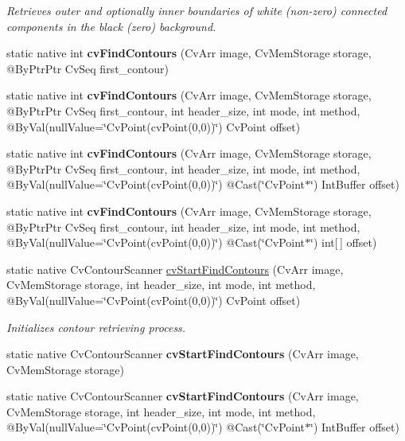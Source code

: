 \begin{DoxyCompactItemize}
\begin{DoxyCompactList}\small\item\em Retrieves outer and optionally inner boundaries of white (non-\/zero) connected components in the black (zero) background. \end{DoxyCompactList}\item 
static native int {\bfseries cv\+Find\+Contours} (Cv\+Arr image, Cv\+Mem\+Storage storage, @By\+Ptr\+Ptr Cv\+Seq first\+\_\+contour)
\item 
static native int {\bfseries cv\+Find\+Contours} (Cv\+Arr image, Cv\+Mem\+Storage storage, @By\+Ptr\+Ptr Cv\+Seq first\+\_\+contour, int header\+\_\+size, int mode, int method, @By\+Val(null\+Value=\char`\"{}Cv\+Point(cv\+Point(0,0))\char`\"{}) Cv\+Point offset)
\item 
static native int {\bfseries cv\+Find\+Contours} (Cv\+Arr image, Cv\+Mem\+Storage storage, @By\+Ptr\+Ptr Cv\+Seq first\+\_\+contour, int header\+\_\+size, int mode, int method, @By\+Val(null\+Value=\char`\"{}Cv\+Point(cv\+Point(0,0))\char`\"{}) @Cast(\char`\"{}Cv\+Point$\ast$\char`\"{}) Int\+Buffer offset)
\item 
static native int {\bfseries cv\+Find\+Contours} (Cv\+Arr image, Cv\+Mem\+Storage storage, @By\+Ptr\+Ptr Cv\+Seq first\+\_\+contour, int header\+\_\+size, int mode, int method, @By\+Val(null\+Value=\char`\"{}Cv\+Point(cv\+Point(0,0))\char`\"{}) @Cast(\char`\"{}Cv\+Point$\ast$\char`\"{}) int\mbox{[}$\,$\mbox{]} offset)
\item 
static native Cv\+Contour\+Scanner \hyperlink{group__imgproc__c_ga17ceae2468b1b23ece917fb982a377ff}{cv\+Start\+Find\+Contours} (Cv\+Arr image, Cv\+Mem\+Storage storage, int header\+\_\+size, int mode, int method, @By\+Val(null\+Value=\char`\"{}Cv\+Point(cv\+Point(0,0))\char`\"{}) Cv\+Point offset)
\begin{DoxyCompactList}\small\item\em Initializes contour retrieving process. \end{DoxyCompactList}\item 
static native Cv\+Contour\+Scanner {\bfseries cv\+Start\+Find\+Contours} (Cv\+Arr image, Cv\+Mem\+Storage storage)
\item 
static native Cv\+Contour\+Scanner {\bfseries cv\+Start\+Find\+Contours} (Cv\+Arr image, Cv\+Mem\+Storage storage, int header\+\_\+size, int mode, int method, @By\+Val(null\+Value=\char`\"{}Cv\+Point(cv\+Point(0,0))\char`\"{}) @Cast(\char`\"{}Cv\+Point$\ast$\char`\"{}) Int\+Buffer offset)
\item 

\end{DoxyCompactItemize}
